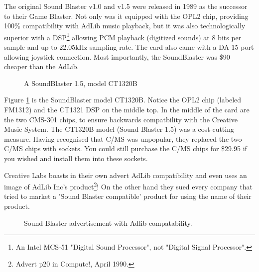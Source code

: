 \documentclass[book.tex]{subfiles}
\begin{document}
  \par
The original Sound Blaster v1.0 and v1.5 were released in 1989 as the successor to their Game Blaster. Not only was it equipped with the OPL2 chip, providing 100\% compatibility with AdLib music playback, but it was also technologically superior with a DSP\footnote{An Intel MCS-51 "Digital Sound Processor", not "Digital Signal Processor".} allowing PCM playback (digitized sounds) at 8 bits per sample and up to 22.05kHz sampling rate. The card also came with a DA-15 port allowing joystick connection. Most importantly, the SoundBlaster was \$90 cheaper than the AdLib.

\begin{figure}[H] 
  \centering 
  \caption{A SoundBlaster 1.5, model CT1320B }
  \label{asb15}
\end{figure}

\par
Figure \ref{asb15} is the SoundBlaster model CT1320B. Notice the OPL2 chip (labeled FM1312) and the CT1321 DSP on the middle top. In the middle of the card are the two CMS-301 chips, to ensure backwards compatbility with the Creative Music System. The CT1320B model (Sound Blaster 1.5) was a cost-cutting measure. Having recognised that C/MS was unpopular, they replaced the two C/MS chips with sockets. You could still purchase the C/MS chips for \$29.95 if you wished and install them into these sockets.\\
  
\par
Creative Labs boasts in their own advert AdLib compatibility and even uses an image of AdLib Inc's product\footnote{Advert p20 in Compute!, April 1990.}! On the other hand they sued every company that tried to market a 'Sound Blaster compatible' product for using the name of their product.\\

\begin{figure}[H] 
  \centering 
  \caption{Sound Blaster advertisement with Adlib compatability.}
  \label{asb15_advertise}
\end{figure}


  
  
\end{document}
